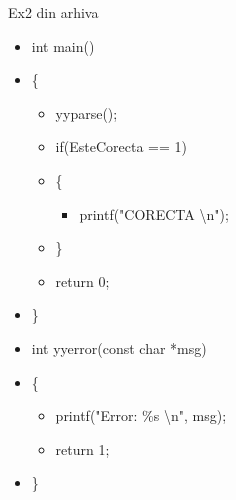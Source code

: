 \documentclass[pdf]{beamer}
\begin{document}
\begin{frame}{Ex2 din arhiva}
\begin{itemize}
	\item[]
	int main()

	\item[]
	\{

		\begin{itemize}
			\item[]
			yyparse();
				\linebreak

			\item[]
			if(EsteCorecta == 1)

			\item[]
			\{
				
				\begin{itemize}
					\item[]
					printf("CORECTA \textbackslash n");
				\end{itemize}

			\item[]
			\}
				\linebreak

			\item[]
			return 0;
		\end{itemize}

	\item[]
	\}
		\linebreak

	\item[]
	int yyerror(const char *msg)

	\item[]
	\{

		\begin{itemize}
			\item[]
			printf("Error: \%s \textbackslash n", msg);

			\item[]
			return 1;
		\end{itemize}

	\item[]
	\}

\end{itemize}
\end{frame}
\end{document}
